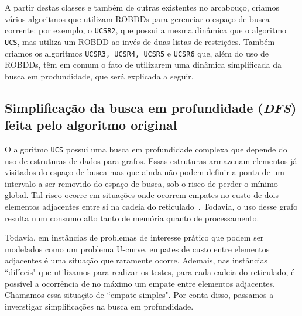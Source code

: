 \documentclass[12pt]{article}
\begin{document}
A partir destas classes e também de outras existentes no arcabouço, criamos vários algoritmos que utilizam ROBDDs para gerenciar o espaço de busca corrente: por exemplo, o {\tt UCSR2}, que possui a mesma dinâmica que o algoritmo {\tt UCS}, mas utiliza um ROBDD ao invés de duas listas de restrições. Também criamos os algoritmos {\tt UCSR3, UCSR4, UCSR5} e {\tt UCSR6} que, além do uso de ROBDDs, têm em comum o fato de utilizarem uma dinâmica simplificada da busca em produndidade, que será explicada a seguir.


\subsection{Simplificação da busca em profundidade ({\em DFS}) feita pelo algoritmo original} \label{sec:atividades:DFS}

O algoritmo {\tt UCS} possui uma busca em profundidade complexa que depende do uso de estruturas de dados para grafos. Essas estruturas armazenam elementos já visitados do espaço de busca mas que ainda não podem definir a ponta de um intervalo a ser removido do espaço de busca, sob o risco de perder o mínimo global. Tal risco ocorre em situações onde ocorrem empates no custo de dois elementos adjacentes entre si na cadeia do reticulado~\cite{msreis thesis}. Todavia, o uso desse grafo resulta num consumo alto tanto de memória quanto de processamento. 


Todavia, em instâncias de problemas de interesse prático que podem ser modelados como um problema U-curve, empates de custo entre elementos adjacentes é uma situação que raramente ocorre. Ademais, nas instâncias ``difíceis" que utilizamos para realizar os testes, para cada cadeia do reticulado, é possível a ocorrência de no máximo um empate entre elementos adjacentes. Chamamos essa situação de ``empate simples". Por conta disso, passamos a inverstigar simplificações na busca em profundidade.
\end{document}
